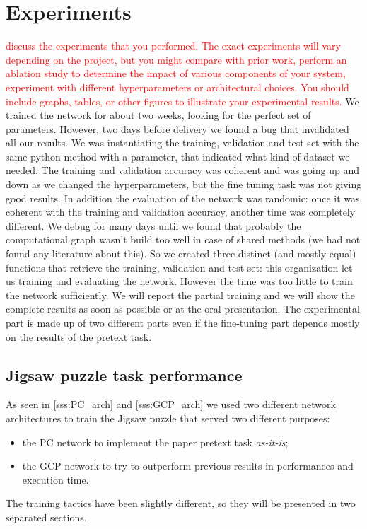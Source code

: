 \section{Experiments}
\textcolor{red}{discuss the experiments that you performed. The exact experiments will vary depending on the project, but you might compare with prior work, perform an ablation study to determine the impact of various components of your system, experiment with different hyperparameters or architectural choices. You should include graphs, tables, or other figures to illustrate your experimental results.}
We trained the network for about two weeks, looking for the perfect set of parameters. However, two days before delivery we found a bug that invalidated all our results. We was instantiating the training, validation and test set with the same python method with a parameter, that indicated what kind of dataset we needed. The training and validation accuracy was coherent and was going up and down as we changed the hyperparameters, but the fine tuning task was not giving good results. In addition the evaluation of the network was randomic: once it was coherent with the training and validation accuracy, another time was completely different. We debug for many days until we found that probably the computational graph wasn't build too well in case of shared methods (we had not found any literature about this). So we created three distinct (and mostly equal) functions that retrieve the training, validation and test set: this organization let us training and evaluating the network. However the time was too little to train the network sufficiently. We will report the partial training and we will show the complete results as soon as possible or at the oral presentation.\newline
The experimental part is made up of two different parts even if the fine-tuning part depends mostly on the results of the pretext task. 


\subsection{Jigsaw puzzle task performance}
As seen in \ref{sss:PC_arch} and \ref{sss:GCP_arch} we used two different network architectures to train the Jigsaw puzzle that served two different purposes:
\begin{itemize}
    \item the PC network to implement the paper pretext task \emph{as-it-is};
    \item the GCP network to try to outperform previous results in performances and execution time.
\end{itemize}
The training tactics have been slightly different, so they will be presented in two separated sections.

